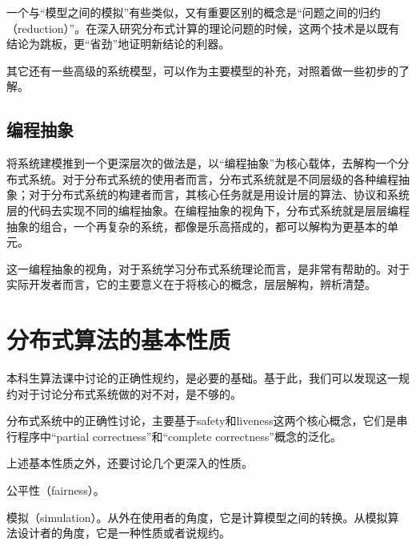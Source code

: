 \documentclass[UTF8]{ctexrep}
\begin{document}
一个与“模型之间的模拟”有些类似，又有重要区别的概念是“问题之间的归约（reduction）”。在深入研究分布式计算的理论问题的时候，这两个技术是以既有结论为跳板，更“省劲”地证明新结论的利器。

其它还有一些高级的系统模型，可以作为主要模型的补充，对照着做一些初步的了解。


\section{编程抽象}

将系统建模推到一个更深层次的做法是，以“编程抽象”为核心载体，去解构一个分布式系统。对于分布式系统的使用者而言，分布式系统就是不同层级的各种编程抽象；对于分布式系统的构建者而言，其核心任务就是用设计层的算法、协议和系统层的代码去实现不同的编程抽象。在编程抽象的视角下，分布式系统就是层层编程抽象的组合，一个再复杂的系统，都像是乐高搭成的，都可以解构为更基本的单元。

这一编程抽象的视角，对于系统学习分布式系统理论而言，是非常有帮助的。对于实际开发者而言，它的主要意义在于将核心的概念，层层解构，辨析清楚。


\chapter{分布式算法的基本性质}

本科生算法课中讨论的正确性规约，是必要的基础。基于此，我们可以发现这一规约对于讨论分布式系统做的对不对，是不够的。

分布式系统中的正确性讨论，主要基于safety和liveness这两个核心概念，它们是串行程序中“partial correctness”和“complete correctness”概念的泛化。


上述基本性质之外，还要讨论几个更深入的性质。

公平性（fairness）。

模拟（simulation）。从外在使用者的角度，它是计算模型之间的转换。从模拟算法设计者的角度，它是一种性质或者说规约。
\end{document}
